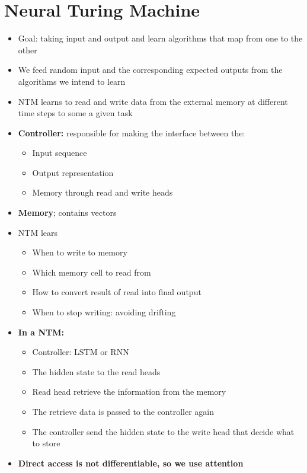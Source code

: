 \section{Neural Turing Machine}
\begin{itemize}
    \item Goal: taking input and output and learn algorithms that map from one to the other
    \item We feed random input and the corresponding expected outputs from the algorithms we intend to learn
    \item NTM learns to read and write data from the external memory at different time steps to some a given task
    \item \textbf{Controller:} responsible for making the interface between the:
    \begin{itemize}
        \item Input sequence
        \item Output representation
        \item Memory through read and write heads
    \end{itemize}
    \item \textbf{Memory}; contains vectors
    \item NTM lears
    \begin{itemize}
        \item When to write to memory
        \item Which memory cell to read from
        \item How to convert result of read into final output
        \item When to stop writing: avoiding drifting
    \end{itemize}
    \item \textbf{In a NTM:}
    \begin{itemize}
        \item Controller: LSTM or RNN
        \item The hidden state to the read heads
        \item Read head retrieve the information from the memory
        \item The retrieve data is passed to the controller again
        \item The controller send the hidden state to the write head that decide what to store
    \end{itemize}
    \item \textbf{Direct access is not differentiable, so we use attention}
    \begin{itemize}

\end{itemize}
\end{itemize}
